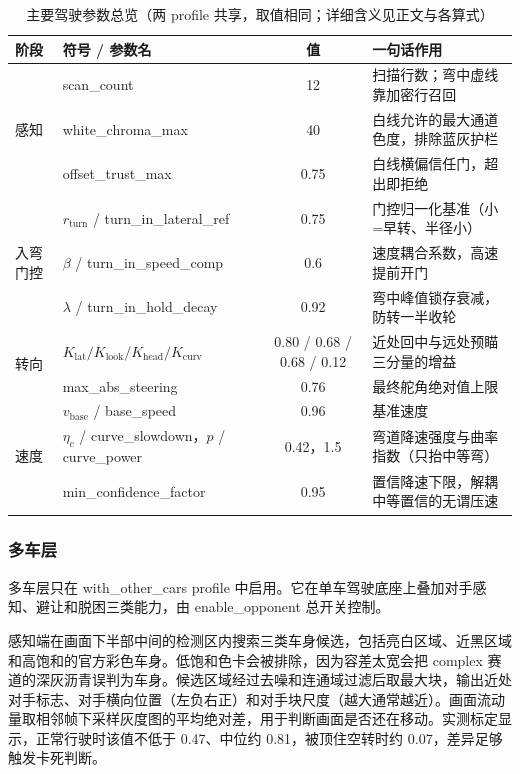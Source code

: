 \documentclass[UTF8,a4paper]{ctexart}
\begin{document}
\begin{table}[!htbp]
\centering
\caption{主要驾驶参数总览（两 profile 共享，取值相同；详细含义见正文与各算式）}
\label{tab:core_params}
\small
\begin{tabularx}{0.97\textwidth}{@{}llcX@{}}
\toprule
阶段 & 符号 / 参数名 & 值 & 一句话作用 \\
\midrule
\multirow{3}{*}{感知}
 & scan\_count & 12 & 扫描行数；弯中虚线靠加密行召回 \\
 & white\_chroma\_max & 40 & 白线允许的最大通道色度，排除蓝灰护栏 \\
 & offset\_trust\_max & 0.75 & 白线横偏信任门，超出即拒绝 \\
\midrule
\multirow{3}{*}{入弯门控}
 & $r_{\text{turn}}$ / turn\_in\_lateral\_ref & 0.75 & 门控归一化基准（小=早转、半径小） \\
 & $\beta$ / turn\_in\_speed\_comp & 0.6 & 速度耦合系数，高速提前开门 \\
 & $\lambda$ / turn\_in\_hold\_decay & 0.92 & 弯中峰值锁存衰减，防转一半收轮 \\
\midrule
\multirow{2}{*}{转向}
 & $K_{\text{lat}}/K_{\text{look}}/K_{\text{head}}/K_{\text{curv}}$ & 0.80 / 0.68 / 0.68 / 0.12 & 近处回中与远处预瞄三分量的增益 \\
 & max\_abs\_steering & 0.76 & 最终舵角绝对值上限 \\
\midrule
\multirow{3}{*}{速度}
 & $v_{\text{base}}$ / base\_speed & 0.96 & 基准速度 \\
 & $\eta_c$ / curve\_slowdown，$p$ / curve\_power & 0.42，1.5 & 弯道降速强度与曲率指数（只抬中等弯） \\
 & min\_confidence\_factor & 0.95 & 置信降速下限，解耦中等置信的无谓压速 \\
\bottomrule
\end{tabularx}
\end{table}

\subsubsection{多车层}\label{sec:multicar_layer}

多车层只在 with\_other\_cars profile 中启用。它在单车驾驶底座上叠加对手感知、避让和脱困三类能力，由 enable\_opponent 总开关控制。

感知端在画面下半部中间的检测区内搜索三类车身候选，包括亮白区域、近黑区域和高饱和的官方彩色车身。低饱和色卡会被排除，因为容差太宽会把 complex 赛道的深灰沥青误判为车身。候选区域经过去噪和连通域过滤后取最大块，输出近处对手标志、对手横向位置（左负右正）和对手块尺度（越大通常越近）。画面流动量取相邻帧下采样灰度图的平均绝对差，用于判断画面是否还在移动。实测标定显示，正常行驶时该值不低于 0.47、中位约 0.81，被顶住空转时约 0.07，差异足够触发卡死判断。
\end{document}
